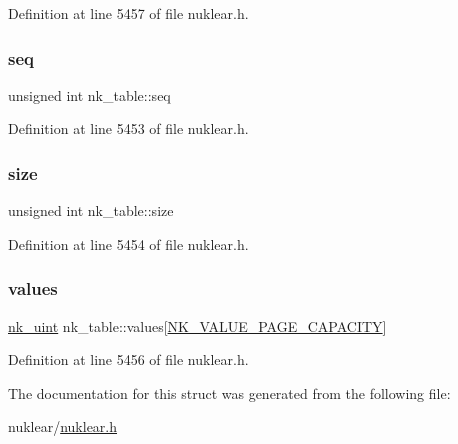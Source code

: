 Definition at line 5457 of file nuklear.\+h.

\mbox{\label{structnk__table_aa64704d2e52b6663f61c043b0378b2d4}} 
\subsubsection{\texorpdfstring{seq}{seq}}
{\footnotesize\ttfamily unsigned int nk\+\_\+table\+::seq}



Definition at line 5453 of file nuklear.\+h.

\mbox{\label{structnk__table_a173992867275727635fff4f21e825d99}} 
\subsubsection{\texorpdfstring{size}{size}}
{\footnotesize\ttfamily unsigned int nk\+\_\+table\+::size}



Definition at line 5454 of file nuklear.\+h.

\mbox{\label{structnk__table_ae686139ae8eb9913024a5513c70bde76}} 
\subsubsection{\texorpdfstring{values}{values}}
{\footnotesize\ttfamily \mbox{\hyperlink{nuklear_8h_a951b598a3101b6d2a55d22ac39f57919}{nk\+\_\+uint}} nk\+\_\+table\+::values\mbox{[}\mbox{\hyperlink{nuklear_8h_a8dc0d705f81317352b98df20a6481b52}{N\+K\+\_\+\+V\+A\+L\+U\+E\+\_\+\+P\+A\+G\+E\+\_\+\+C\+A\+P\+A\+C\+I\+TY}}\mbox{]}}



Definition at line 5456 of file nuklear.\+h.



The documentation for this struct was generated from the following file\+:\begin{DoxyCompactItemize}
\item 
nuklear/\mbox{\hyperlink{nuklear_8h}{nuklear.\+h}}\end{DoxyCompactItemize}
